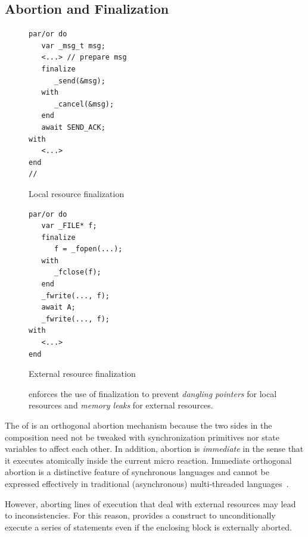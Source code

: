 \subsection{Abortion and Finalization}
\label{sec.ceu.fin}

\begin{figure}[h]
\begin{minipage}[t]{0.45\linewidth}
\begin{lstlisting}[numbers=right]
par/or do
   var _msg_t msg;
   <...> // prepare msg
   finalize
      _send(&msg);
   with
      _cancel(&msg);
   end
   await SEND_ACK;
with
   <...>
end
//
\end{lstlisting}
\small{\ax\!Local resource finalization}
\end{minipage}%
%
\begin{minipage}[t]{0.53\linewidth}
\begin{lstlisting}[xleftmargin=2em]
par/or do
   var _FILE* f;
   finalize
      f = _fopen(...);
   with
      _fclose(f);
   end
   _fwrite(..., f);
   await A;
   _fwrite(..., f);
with
   <...>
end
\end{lstlisting}
\centering\small{\bx External resource finalization}
\end{minipage}%
\caption{%
\CEU enforces the use of finalization to prevent \emph{dangling pointers} for
local resources and \emph{memory leaks} for external resources.%
\label{lst.fin.ceu}}
\end{figure}

The  of \CEU is an orthogonal abortion mechanism because the two
sides in the composition need not be tweaked with synchronization primitives nor
state variables to affect each other.
%
In addition, abortion is \emph{immediate} in the sense that it executes
atomically inside the current micro reaction.
%
Immediate orthogonal abortion is a distinctive feature of synchronous languages
and cannot be expressed effectively in traditional (asynchronous)
multi-threaded languages~\cite{esterel.preemption,sync_async.threadsstop}.

However, aborting lines of execution that deal with external resources may lead
to inconsistencies.
%
For this reason, \CEU provides a  construct to unconditionally
execute a series of statements even if the enclosing block is externally
aborted.


